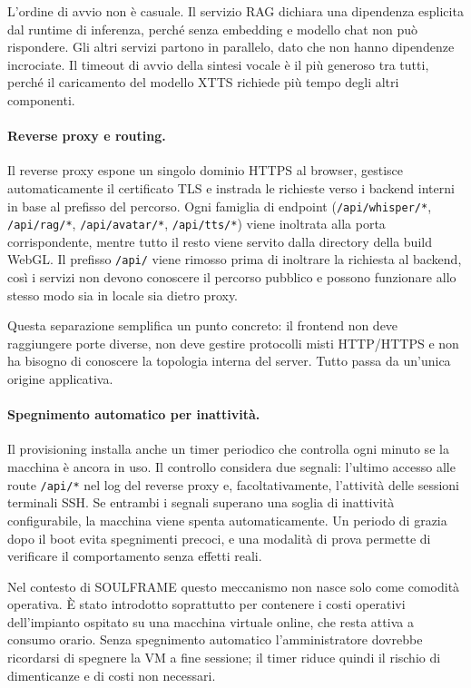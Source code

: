 L'ordine di avvio non è casuale. Il servizio RAG dichiara una dipendenza esplicita dal runtime di inferenza, perché senza embedding e modello chat non può rispondere. Gli altri servizi partono in parallelo, dato che non hanno dipendenze incrociate. Il timeout di avvio della sintesi vocale è il più generoso tra tutti, perché il caricamento del modello XTTS richiede più tempo degli altri componenti.

\paragraph{Reverse proxy e routing.}
Il reverse proxy espone un singolo dominio HTTPS al browser, gestisce automaticamente il certificato TLS e instrada le richieste verso i backend interni in base al prefisso del percorso. Ogni famiglia di endpoint (\texttt{/api/whisper/*}, \texttt{/api/rag/*}, \texttt{/api/avatar/*}, \texttt{/api/tts/*}) viene inoltrata alla porta corrispondente, mentre tutto il resto viene servito dalla directory della build WebGL. Il prefisso \texttt{/api/} viene rimosso prima di inoltrare la richiesta al backend, così i servizi non devono conoscere il percorso pubblico e possono funzionare allo stesso modo sia in locale sia dietro proxy.

Questa separazione semplifica un punto concreto: il frontend non deve raggiungere porte diverse, non deve gestire protocolli misti HTTP/HTTPS e non ha bisogno di conoscere la topologia interna del server. Tutto passa da un'unica origine applicativa.

\paragraph{Spegnimento automatico per inattività.}
Il provisioning installa anche un timer periodico che controlla ogni minuto se la macchina è ancora in uso. Il controllo considera due segnali: l'ultimo accesso alle route \texttt{/api/*} nel log del reverse proxy e, facoltativamente, l'attività delle sessioni terminali SSH. Se entrambi i segnali superano una soglia di inattività configurabile, la macchina viene spenta automaticamente. Un periodo di grazia dopo il boot evita spegnimenti precoci, e una modalità di prova permette di verificare il comportamento senza effetti reali.

Nel contesto di SOULFRAME questo meccanismo non nasce solo come comodità operativa. È stato introdotto soprattutto per contenere i costi operativi dell'impianto ospitato su una macchina virtuale online, che resta attiva a consumo orario. Senza spegnimento automatico l'amministratore dovrebbe ricordarsi di spegnere la VM a fine sessione; il timer riduce quindi il rischio di dimenticanze e di costi non necessari.

